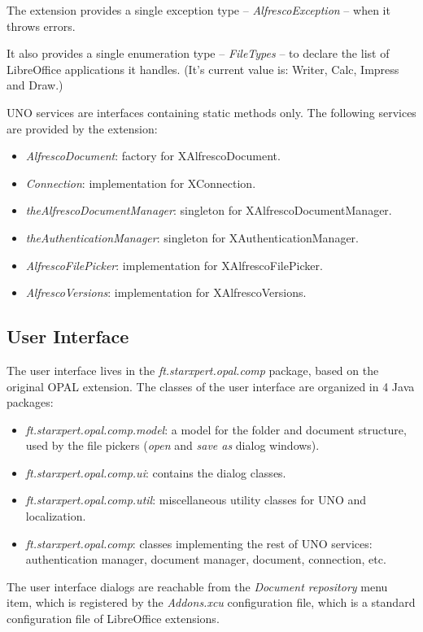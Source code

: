 The extension provides a single exception type -- \emph{AlfrescoException} --
when it throws errors.

It also provides a single enumeration type -- \emph{FileTypes} -- to declare
the list of LibreOffice applications it handles. (It's current value is:
Writer, Calc, Impress and Draw.)

UNO services are interfaces containing static methods only.  The following
services are provided by the extension:

\begin{itemize}
\item \emph{AlfrescoDocument}: factory for XAlfrescoDocument.
\item \emph{Connection}: implementation for XConnection.
\item \emph{theAlfrescoDocumentManager}: singleton for XAlfrescoDocumentManager.
\item \emph{theAuthenticationManager}: singleton for XAuthenticationManager.
\item \emph{AlfrescoFilePicker}: implementation for XAlfrescoFilePicker.
\item \emph{AlfrescoVersions}: implementation for XAlfrescoVersions.
\end{itemize}

\subsection{User Interface}

The user interface lives in the \emph{ft.starxpert.opal.comp} package, based on
the original OPAL extension. The classes of the user interface are organized in
4 Java packages:

\begin{itemize}
\item \emph{ft.starxpert.opal.comp.model}: a model for the folder and document
structure, used by the file pickers (\emph{open} and \emph{save as} dialog
windows).
\item \emph{ft.starxpert.opal.comp.ui}: contains the dialog classes.
\item \emph{ft.starxpert.opal.comp.util}: miscellaneous utility classes for UNO and localization.
\item \emph{ft.starxpert.opal.comp}: classes implementing the rest of UNO
services: authentication manager, document manager, document, connection, etc.
\end{itemize}

The user interface dialogs are reachable from the \emph{Document repository}
menu item, which is registered by the \emph{Addons.xcu} configuration file,
which is a standard configuration file of LibreOffice extensions.

